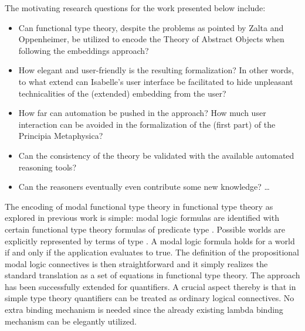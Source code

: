 \begin{isabellebody}
\begin{isamarkuptext}
 The motivating research questions for the work presented below include:
 \begin{itemize} 
 \item Can functional type theory, despite the problems as pointed by Zalta and Oppenheimer, 
  be utilized to encode the Theory of Abstract Objects when following the embeddings approach?
 \item How elegant and user-friendly is the resulting formalization? In other
  words, to what extend can Isabelle's  user interface be facilitated to hide 
  unpleasant technicalities of the (extended) embedding from the user?
 \item How far can automation be pushed in the approach? How much user interaction can
  be avoided in the formalization of the (first part) of the Principia Metaphysica? 
 \item Can the consistency of the theory be validated with the available automated 
  reasoning tools?
 \item Can the reasoners eventually even contribute some new knowledge? 
 \ldots
 \end{itemize}%
\end{isamarkuptext}%
\isamarkuptrue%
%
\begin{isamarkuptext}%
The encoding of modal functional type theory in functional type theory as explored in 
 previous work \cite{J23,C40} is simple: modal logic formulas are identified with certain functional 
 type theory formulas of predicate type . Possible worlds are explicitly represented by 
 terms of type  . A modal logic \isa{{\isasymphi}} formula holds for a world  if and 
 only if the application  evaluates to true. The definition of the propositional modal logic 
 connectives is then straightforward and it simply realizes the standard translation as a set of equations 
 in functional type theory. The approach has been successfully extended for quantifiers. A crucial 
 aspect thereby is that in simple type theory quantifiers can be treated
 as ordinary logical connectives. No extra binding mechanism is needed since the already existing 
 lambda binding mechanism can be elegantly utilized. 
  

\end{isamarkuptext}
\end{isabellebody}
